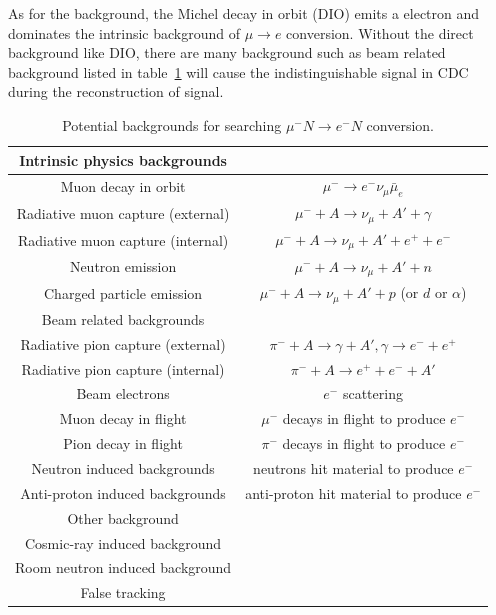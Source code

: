 As for the background, the Michel decay in orbit (DIO) emits a electron and dominates the intrinsic background of $\mu \rightarrow e$ conversion.
Without the direct background like DIO, there are many background such as beam related background listed in table~\ref{backg} will cause the indistinguishable signal in CDC during the reconstruction of signal.
\begin{table}[H]
 \centering
 \begin{tabular}{cc} \hline \hline
  Intrinsic physics backgrounds & \\ \hline
  Muon decay in orbit & $\mu^- \rightarrow e^-\nu_\mu\bar\mu_e$ \\
  Radiative muon capture (external) & $\mu^- + A \rightarrow \nu_\mu + A' + \gamma$ \\
  Radiative muon capture (internal) & $\mu^- + A \rightarrow \nu_\mu + A' + e^+ + e^-$ \\
  Neutron emission & $\mu^- + A \rightarrow \nu_\mu + A' + n$ \\
  Charged particle emission & $\mu^- + A \rightarrow \nu_\mu + A' + p$ (or $d$ or $\alpha$) \\ \hline
  Beam related backgrounds & \\ \hline
  Radiative pion capture (external) & $\pi^- + A \rightarrow \gamma + A', \gamma \rightarrow e^- + e^+$ \\
  Radiative pion capture (internal) & $\pi^- + A \rightarrow e^+ + e^- + A'$ \\
  Beam electrons & $e^-$ scattering \\
  Muon decay in flight & $\mu^-$ decays in flight to produce $e^-$ \\
  Pion decay in flight & $\pi^-$ decays in flight to produce $e^-$ \\
  Neutron induced backgrounds & neutrons hit material to produce $e^-$ \\
  Anti-proton induced backgrounds & anti-proton hit material to produce $e^-$ \\ \hline
  Other background & \\ \hline
  Cosmic-ray induced background & \\
  Room neutron induced background & \\
  False tracking \\ \hline \hline
 \end{tabular}
 \caption{Potential backgrounds for searching $\mu^-N \rightarrow e^-N$ conversion.}
 \label{backg}
\end{table}

